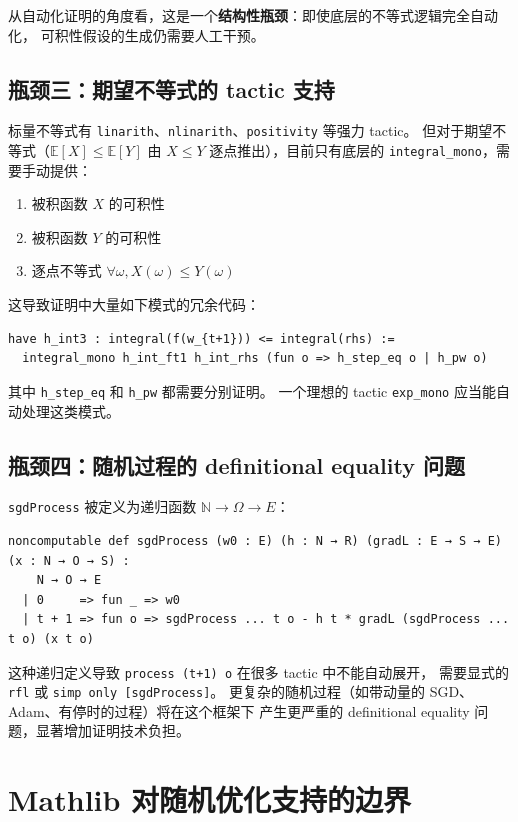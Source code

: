 \documentclass[12pt, a4paper]{article}
\newcommand{\E}{\mathbb{E}}
\newcommand{\N}{\mathbb{N}}
\newcommand{\lean}[1]{\texttt{#1}}
\begin{document}
从自动化证明的角度看，这是一个\textbf{结构性瓶颈}：即使底层的不等式逻辑完全自动化，
可积性假设的生成仍需要人工干预。

\subsection{瓶颈三：期望不等式的 tactic 支持}

标量不等式有 \lean{linarith}、\lean{nlinarith}、\lean{positivity} 等强力 tactic。
但对于期望不等式（$\E[X] \leq \E[Y]$ 由 $X \leq Y$ 逐点推出），目前只有底层的
\lean{integral\_mono}，需要手动提供：
\begin{enumerate}
  \item 被积函数 $X$ 的可积性
  \item 被积函数 $Y$ 的可积性
  \item 逐点不等式 $\forall \omega, X(\omega) \leq Y(\omega)$
\end{enumerate}

这导致证明中大量如下模式的冗余代码：
\begin{lstlisting}
have h_int3 : integral(f(w_{t+1})) <= integral(rhs) :=
  integral_mono h_int_ft1 h_int_rhs (fun o => h_step_eq o | h_pw o)
\end{lstlisting}
其中 \lean{h\_step\_eq} 和 \lean{h\_pw} 都需要分别证明。
一个理想的 tactic \lean{exp\_mono} 应当能自动处理这类模式。

\subsection{瓶颈四：随机过程的 definitional equality 问题}

\lean{sgdProcess} 被定义为递归函数 $\N \to \Omega \to E$：
\begin{lstlisting}
noncomputable def sgdProcess (w0 : E) (h : N → R) (gradL : E → S → E) (x : N → O → S) :
    N → O → E
  | 0     => fun _ => w0
  | t + 1 => fun o => sgdProcess ... t o - h t * gradL (sgdProcess ... t o) (x t o)
\end{lstlisting}

这种递归定义导致 \lean{process (t+1) o} 在很多 tactic 中不能自动展开，
需要显式的 \lean{rfl} 或 \lean{simp only [sgdProcess]}。
更复杂的随机过程（如带动量的 SGD、Adam、有停时的过程）将在这个框架下
产生更严重的 definitional equality 问题，显著增加证明技术负担。

\section{Mathlib 对随机优化支持的边界}
\end{document}
